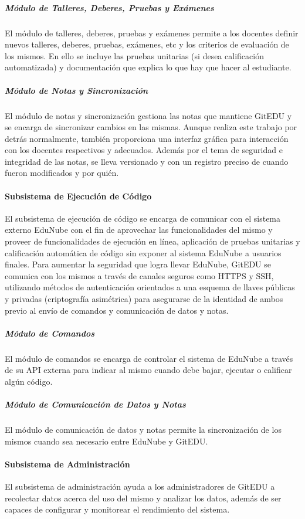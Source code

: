 \subparagraph{Módulo de Talleres, Deberes, Pruebas y Exámenes}
El módulo de talleres, deberes, pruebas y exámenes permite a los docentes definir nuevos talleres, deberes, pruebas, exámenes, etc y los criterios de evaluación de los mismos. En ello se incluye las pruebas unitarias (si desea calificación automatizada) y documentación que explica lo que hay que hacer al estudiante.

\subparagraph{Módulo de Notas y Sincronización}
El módulo de notas y sincronización gestiona las notas que mantiene GitEDU y se encarga de sincronizar cambios en las mismas. Aunque realiza este trabajo por detrás normalmente, también proporciona una interfaz gráfica para interacción con los docentes respectivos y adecuados. Además por el tema de seguridad e integridad de las notas, se lleva versionado y con un registro preciso de cuando fueron modificados y por quién.

\paragraph{Subsistema de Ejecución de Código}
 
El subsistema de ejecución de código se encarga de comunicar con el sistema externo EduNube con el fin de aprovechar las funcionalidades del mismo y proveer de funcionalidades de ejecución en línea, aplicación de pruebas unitarias y calificación automática de código sin exponer al sistema EduNube a usuarios finales. Para aumentar la seguridad que logra llevar EduNube, GitEDU se comunica con los mismos a través de canales seguros como HTTPS y SSH, utilizando métodos de autenticación orientados a una esquema de llaves públicas y privadas (criptografía asimétrica) para asegurarse de la identidad de ambos previo al envío de comandos y comunicación de datos y notas.

\subparagraph{Módulo de Comandos}
 
El módulo de comandos se encarga de controlar el sistema de EduNube a través de su API externa para indicar al mismo cuando debe bajar, ejecutar o calificar algún código.

\subparagraph{Módulo de Comunicación de Datos y Notas}
El módulo de comunicación de datos y notas permite la sincronización de los mismos cuando sea necesario entre EduNube y GitEDU.

\paragraph{Subsistema de Administración}
El subsistema de administración ayuda a los administradores de GitEDU a recolectar datos acerca del uso del mismo y analizar los datos, además de ser capaces de configurar y monitorear el rendimiento del sistema.

